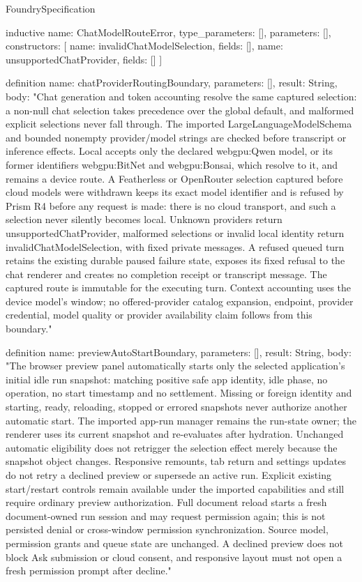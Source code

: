 \begin{lexlean}{FoundrySpecification}
\begin{semanticmodule}
inductive{
  name: ChatModelRouteError,
  type_parameters: [],
  parameters: [],
  constructors: [
    {name: invalidChatModelSelection, fields: []},
    {name: unsupportedChatProvider, fields: []}
  ]
}

definition{
  name: chatProviderRoutingBoundary,
  parameters: [],
  result: String,
  body: "Chat generation and token accounting resolve the same captured selection: a non-null chat selection takes precedence over the global default, and malformed explicit selections never fall through. The imported LargeLanguageModelSchema and bounded nonempty provider/model strings are checked before transcript or inference effects. Local accepts only the declared webgpu:Qwen model, or its former identifiers webgpu:BitNet and webgpu:Bonsai, which resolve to it, and remains a device route. A Featherless or OpenRouter selection captured before cloud models were withdrawn keeps its exact model identifier and is refused by Prism R4 before any request is made: there is no cloud transport, and such a selection never silently becomes local. Unknown providers return unsupportedChatProvider, malformed selections or invalid local identity return invalidChatModelSelection, with fixed private messages. A refused queued turn retains the existing durable paused failure state, exposes its fixed refusal to the chat renderer and creates no completion receipt or transcript message. The captured route is immutable for the executing turn. Context accounting uses the device model's window; no offered-provider catalog expansion, endpoint, provider credential, model quality or provider availability claim follows from this boundary."
}

definition{
  name: previewAutoStartBoundary,
  parameters: [],
  result: String,
  body: "The browser preview panel automatically starts only the selected application's initial idle run snapshot: matching positive safe app identity, idle phase, no operation, no start timestamp and no settlement. Missing or foreign identity and starting, ready, reloading, stopped or errored snapshots never authorize another automatic start. The imported app-run manager remains the run-state owner; the renderer uses its current snapshot and re-evaluates after hydration. Unchanged automatic eligibility does not retrigger the selection effect merely because the snapshot object changes. Responsive remounts, tab return and settings updates do not retry a declined preview or supersede an active run. Explicit existing start/restart controls remain available under the imported capabilities and still require ordinary preview authorization. Full document reload starts a fresh document-owned run session and may request permission again; this is not persisted denial or cross-window permission synchronization. Source model, permission grants and queue state are unchanged. A declined preview does not block Ask submission or cloud consent, and responsive layout must not open a fresh permission prompt after decline."
}


\end{semanticmodule}
\end{lexlean}
